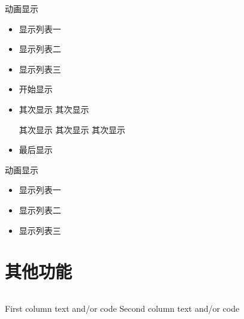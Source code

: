 \documentclass{beamer}
\begin{document}
	\begin{frame}{动画显示}  
	\begin{itemize}  
		\item<1->显示列表一  
		
		\item<2->显示列表二  
		
		\item<3->显示列表三  
		
	\end{itemize}  
	\end{frame}  

	\begin{frame}  
		\begin{itemize}[<+->]  
			\item 开始显示  
			\item 其次显示  
			其次显示  
			
			其次显示  
			其次显示  其次显示  
			\item 最后显示  
		\end{itemize}  
	\end{frame}  

	\begin{frame}{动画显示}  
		\begin{itemize}  
			\item<+-| structure@+>显示列表一  
			
			\item<2-| alert@+>显示列表二  
			
			\item<3->显示列表三  
			
		\end{itemize}  
	\end{frame}

	\section{其他功能}
	
	\begin{frame}
		\begin{columns}
			First column text and/or code
			Second column text and/or code
		\end{columns}
	\end{frame}
\end{document}
